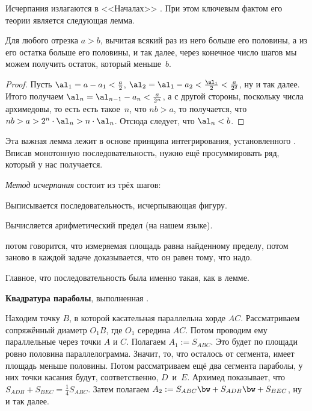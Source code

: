 \documentclass[a4paper,oneside,fleqn,10pt]{article}
\begin{document}
Исчерпания излагаются в <<Началах>> .  При этом
ключевым фактом его теории является следующая лемма.

\begin{lemma}
Для любого отрезка $a > b$, вычитая всякий раз из него больше его
половины, а из его остатка больше его половины, и так далее, через
конечное число шагов мы можем получить остаток, который меньше~$b$.
\end{lemma}
\begin{proof}
Пусть $\al_1 = a-a_1 < \frac{a}{2}$, $\al_2 = \al_1 - a_2 <
\frac{\al_1}{2} < \frac{a}{2^2}$, ну и так далее. Итого получаем
$\al_n = \al_{n-1} - a_n < \frac{a}{2^n}$, а с другой стороны,
поскольку числа архимедовы, то есть есть такое~$n$, что $nb > a$, то
получается, что $nb > a > 2^n \cdot \al_n > n \cdot \al_n$.  Отсюда
следует, что $\al_n < b$.
\end{proof}

Эта важная лемма лежит в основе принципа интегрирования,
установленного .  Вписав монотонную
последовательность, нужно ещё просуммировать ряд, который у нас
получается.

\emph{Метод исчерпания} состоит из трёх шагов:

\begin{items}{-2}
\item Выписывается последовательность, исчерпывающая фигуру.
\item Вычисляется арифметический предел (на нашем языке).
\item потом говорится, что измеряемая площадь равна найденному
  пределу, потом заново в каждой задаче доказывается, что он равен
  тому, что надо.
\end{items}

Главное, что последовательность была именно такая, как в лемме.

\textbf{Квадратура параболы}, выполненная .

Находим точку $B$, в которой касательная параллельна хорде $AC$.
Рассматриваем сопряжённый диаметр $O_1B$, где $O_1$ середина
$AC$. Потом проводим ему параллельные через точки $A$ и $C$. Полагаем
$A_1 := S_{ABC}$. Это будет по площади ровно половина
параллелограмма. Значит, то, что осталось от сегмента, имеет площадь
меньше половины. Потом рассматриваем ещё два сегмента параболы, у них
точки касания будут, соответственно, $D$~и~$E$. Архимед показывает,
что $S_{ADB} + S_{BEC} = \frac14 S_{ABC}$.  Затем полагаем $A_2 :=
S_{ABC} \bw+ S_{ADB} \bw+ S_{BEC}$, ну и так далее.
\end{document}
